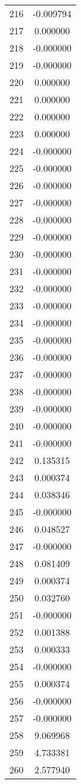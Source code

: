 \documentclass[12pt]{article}
\begin{document}
\begin{longtable}{@{}cc@{}}
216 & -0.009794 \\
217 & 0.000000 \\
218 & -0.000000 \\
219 & -0.000000 \\
220 & 0.000000 \\
221 & 0.000000 \\
222 & 0.000000 \\
223 & 0.000000 \\
224 & -0.000000 \\
225 & -0.000000 \\
226 & -0.000000 \\
227 & -0.000000 \\
228 & -0.000000 \\
229 & -0.000000 \\
230 & -0.000000 \\
231 & -0.000000 \\
232 & -0.000000 \\
233 & -0.000000 \\
234 & -0.000000 \\
235 & -0.000000 \\
236 & -0.000000 \\
237 & -0.000000 \\
238 & -0.000000 \\
239 & -0.000000 \\
240 & -0.000000 \\
241 & -0.000000 \\
242 & 0.135315 \\
243 & 0.000374 \\
244 & 0.038346 \\
245 & -0.000000 \\
246 & 0.048527 \\
247 & -0.000000 \\
248 & 0.081409 \\
249 & 0.000374 \\
250 & 0.032760 \\
251 & -0.000000 \\
252 & 0.001388 \\
253 & 0.000333 \\
254 & -0.000000 \\
255 & 0.000374 \\
256 & -0.000000 \\
257 & -0.000000 \\
258 & 9.069968 \\
259 & 4.733381 \\
260 & 2.577940 \\

\end{longtable}
\end{document}
